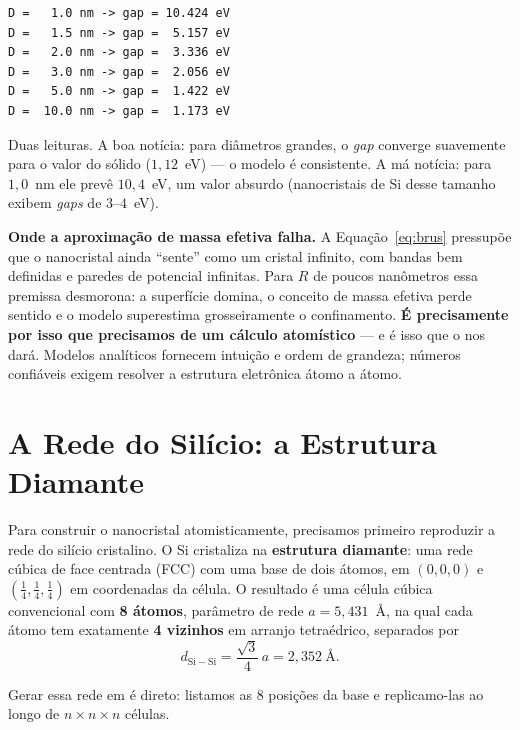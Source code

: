 \begin{lstlisting}[style=console]
D =   1.0 nm -> gap = 10.424 eV
D =   1.5 nm -> gap =  5.157 eV
D =   2.0 nm -> gap =  3.336 eV
D =   3.0 nm -> gap =  2.056 eV
D =   5.0 nm -> gap =  1.422 eV
D =  10.0 nm -> gap =  1.173 eV
\end{lstlisting}

\noindent
Duas leituras. A boa notícia: para diâmetros grandes, o \emph{gap} converge
suavemente para o valor do sólido ($1{,}12$~eV) --- o modelo é consistente. A má
notícia: para $1{,}0$~nm ele prevê $10{,}4$~eV, um valor absurdo (nanocristais de
Si desse tamanho exibem \emph{gaps} de $3$--$4$~eV).

\begin{caixaatencao}
\textbf{Onde a aproximação de massa efetiva falha.} A Equação~\ref{eq:brus}
pressupõe que o nanocristal ainda ``sente'' como um cristal infinito, com bandas
bem definidas e paredes de potencial infinitas. Para $R$ de poucos nanômetros
essa premissa desmorona: a superfície domina, o conceito de massa efetiva perde
sentido e o modelo superestima grosseiramente o confinamento. \textbf{É
precisamente por isso que precisamos de um cálculo atomístico} --- e é isso que o
\pyscf{} nos dará. Modelos analíticos fornecem intuição e ordem de grandeza;
números confiáveis exigem resolver a estrutura eletrônica átomo a átomo.
\end{caixaatencao}

\section{A Rede do Silício: a Estrutura Diamante}
\label{sec:rede}

Para construir o nanocristal atomisticamente, precisamos primeiro reproduzir a
rede do silício cristalino. O Si cristaliza na \textbf{estrutura diamante}: uma
rede cúbica de face centrada (FCC) com uma base de dois átomos, em
$(0,0,0)$ e $(\tfrac14,\tfrac14,\tfrac14)$ em coordenadas da célula. O resultado é
uma célula cúbica convencional com \textbf{8 átomos}, parâmetro de rede
$a = 5{,}431$~Å, na qual cada átomo tem exatamente \textbf{4 vizinhos} em arranjo
tetraédrico, separados por
\[
  d_{\mathrm{Si-Si}} = \frac{\sqrt{3}}{4}\,a = 2{,}352~\text{Å}.
\]

\noindent
Gerar essa rede em \python{} é direto: listamos as 8 posições da base e replicamo-las
ao longo de $n \times n \times n$ células.

